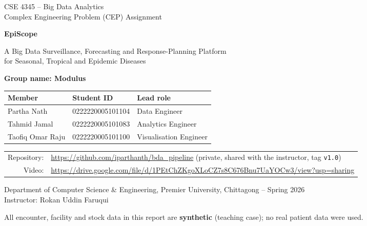 \documentclass[conference]{IEEEtran}
\begin{document}
\begin{titlepage}
\centering
\vspace*{2cm}
{\Large CSE 4345 -- Big Data Analytics\\ Complex Engineering Problem (CEP) Assignment\par}
\vspace{1.2cm}
{\Huge\bfseries EpiScope\par}
\vspace{0.4cm}
{\large A Big Data Surveillance, Forecasting and Response-Planning Platform\\ for Seasonal, Tropical and Epidemic Diseases\par}
\vspace{1.5cm}
{\large\textbf{Group name: Modulus}\par}
\vspace{0.6cm}
\begin{tabular}{lll}
\toprule
Member & Student ID & Lead role \\
\midrule
Partha Nath & 0222220005101104 & Data Engineer \\
Tahmid Jamal & 0222220005101083 & Analytics Engineer \\
Taofiq Omar Raju & 0222220005101100 & Visualisation Engineer \\
\bottomrule
\end{tabular}\par
\vspace{1.2cm}
\begin{tabular}{rl}
Repository: & \url{https://github.com/iparthanth/bda_pipeline} (private, shared with the instructor, tag \texttt{v1.0}) \\
Video: & \url{https://drive.google.com/file/d/1PEtChZKgoXLoCZ7s8C676Bnu7UaYOCw3/view?usp=sharing} \\
\end{tabular}\par
\vfill
{Department of Computer Science \& Engineering, Premier University, Chittagong -- Spring 2026\\
Instructor: Rokan Uddin Faruqui\par}
\vspace{0.5cm}
{\small All encounter, facility and stock data in this report are \textbf{synthetic} (teaching case); no real patient data were used.\par}
\end{titlepage}
\end{document}

